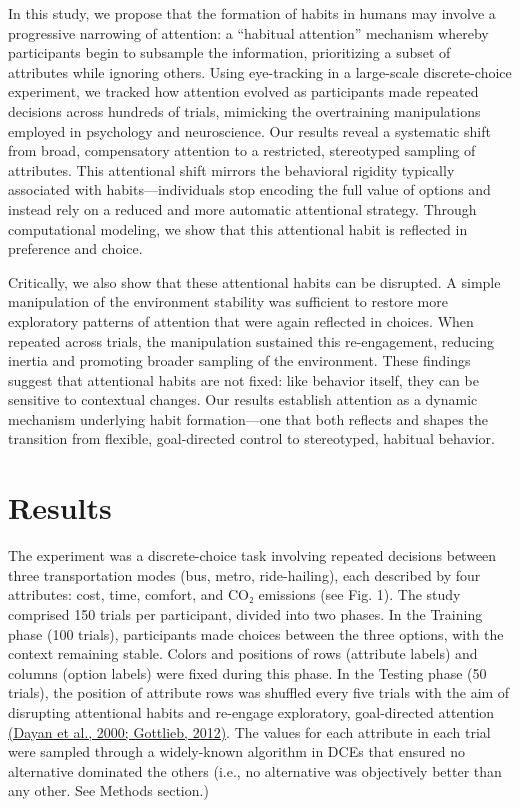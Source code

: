 In this study, we propose that the formation of habits in humans may involve a progressive narrowing of attention: a ``habitual attention'' mechanism whereby participants begin to subsample the information, prioritizing a subset of attributes while ignoring others. Using eye-tracking in a large-scale discrete-choice experiment, we tracked how attention evolved as participants made repeated decisions across hundreds of trials, mimicking the overtraining manipulations employed in psychology and neuroscience. Our results reveal a systematic shift from broad, compensatory attention to a restricted, stereotyped sampling of attributes. This attentional shift mirrors the behavioral rigidity typically associated with habits---individuals stop encoding the full value of options and instead rely on a reduced and more automatic attentional strategy. Through computational modeling, we show that this attentional habit is reflected in preference and choice.

Critically, we also show that these attentional habits can be disrupted. A simple manipulation of the environment stability was sufficient to restore more exploratory patterns of attention that were again reflected in choices. When repeated across trials, the manipulation sustained this re-engagement, reducing inertia and promoting broader sampling of the environment. These findings suggest that attentional habits are not fixed: like behavior itself, they can be sensitive to contextual changes. Our results establish attention as a dynamic mechanism underlying habit formation---one that both reflects and shapes the transition from flexible, goal-directed control to stereotyped, habitual behavior.

\section{Results}\label{results}

The experiment was a discrete-choice task involving repeated decisions between three transportation modes (bus, metro, ride-hailing), each described by four attributes: cost, time, comfort, and CO₂ emissions (see Fig. 1). The study comprised 150 trials per participant, divided into two phases. In the Training phase (100 trials), participants made choices between the three options, with the context remaining stable. Colors and positions of rows (attribute labels) and columns (option labels) were fixed during this phase. In the Testing phase (50 trials), the position of attribute rows was shuffled every five trials with the aim of disrupting attentional habits and re-engage exploratory, goal-directed attention \href{https://www.zotero.org/google-docs/?wVg4TV}{(Dayan et al., 2000; Gottlieb, 2012)}. The values for each attribute in each trial were sampled through a widely-known algorithm in DCEs that ensured no alternative dominated the others (i.e., no alternative was objectively better than any other. See Methods section.)

